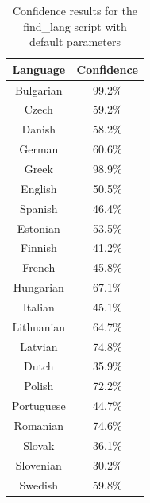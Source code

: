 \documentclass{article}
\begin{document}
\begin{table}[H]
    \centering
    \begin{tabular}{|c|c|}
        \hline
        Language & Confidence \\
        \hline
        Bulgarian & 99.2\% \\
        Czech & 59.2\% \\
        Danish & 58.2\% \\
        German & 60.6\% \\
        Greek & 98.9\% \\
        English & 50.5\% \\
        Spanish & 46.4\% \\
        Estonian & 53.5\% \\
        Finnish & 41.2\% \\
        French & 45.8\% \\
        Hungarian & 67.1\% \\
        Italian & 45.1\% \\
        Lithuanian & 64.7\% \\
        Latvian & 74.8\% \\
        Dutch & 35.9\% \\
        Polish & 72.2\% \\
        Portuguese & 44.7\% \\
        Romanian & 74.6\% \\
        Slovak & 36.1\% \\
        Slovenian & 30.2\% \\
        Swedish & 59.8\% \\
        \hline
    \end{tabular}
    \caption{Confidence results for the find_lang script with default parameters}
    \label{tab:find_lang_default_confidence}
\end{table}
\end{document}
